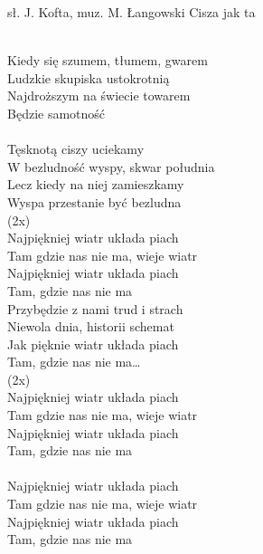 {sł. J. Kofta, muz. M. Łangowski}
{Cisza jak ta}
\begin{text}
\vin \\
Kiedy się szumem, tłumem, gwarem \\
Ludzkie skupiska ustokrotnią \\
Najdroższym na świecie towarem \\
Będzie samotność \\

\vin \\
Tęsknotą ciszy uciekamy \\
W bezludność wyspy, skwar południa \\
Lecz kiedy na niej zamieszkamy \\
Wyspa przestanie być bezludna \\

\vin (2x)\\
\vin Najpiękniej wiatr układa piach \\
\vin Tam gdzie nas nie ma, wieje wiatr \\
\vin Najpiękniej wiatr układa piach \\
\vin Tam, gdzie nas nie ma \\

Przybędzie z nami trud i strach \\
Niewola dnia, historii schemat \\
Jak pięknie wiatr układa piach \\
Tam, gdzie nas nie ma… \\

\vin (2x)\\
\vin Najpiękniej wiatr układa piach \\
\vin Tam gdzie nas nie ma, wieje wiatr \\
\vin Najpiękniej wiatr układa piach \\
\vin Tam, gdzie nas nie ma \\

\vin \\
\vin Najpiękniej wiatr układa piach \\
\vin Tam gdzie nas nie ma, wieje wiatr \\
\vin Najpiękniej wiatr układa piach \\
\vin Tam, gdzie nas nie ma \\
\vin \\
\end{text}
